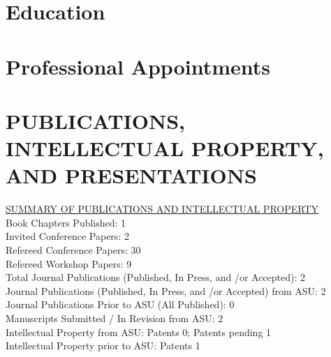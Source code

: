 \documentclass[11pt,letterpaper,sans]{moderncv}
\begin{document}
\makecvtitle

\section{Education}

\section{Professional Appointments}




\section{PUBLICATIONS, INTELLECTUAL PROPERTY, AND PRESENTATIONS}

\begin{framed}
\underline{SUMMARY OF PUBLICATIONS AND INTELLECTUAL PROPERTY} \\
Book Chapters Published: 1 \\
Invited Conference Papers: 2 \\
Refereed Conference Papers: 30 \\
Refereed Workshop Papers: 9 \\
Total Journal Publications (Published, In Press, and /or Accepted): 2 \\
Journal Publications (Published, In Press, and /or Accepted) from ASU: 2 \\
Journal Publications Prior to ASU (All Published): 0 \\
Manuscripts Submitted / In Revision from ASU: 2 \\
Intellectual Property from ASU:  Patents 0; Patents pending 1 \\
Intellectual Property prior to ASU:  Patents 1 \\
\end{framed}
\end{document}

